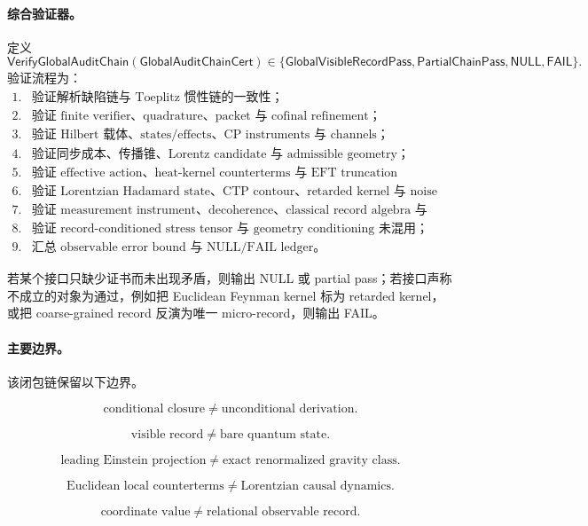 \paragraph{综合验证器。}
定义
\[
\mathsf{VerifyGlobalAuditChain}
(\mathsf{GlobalAuditChainCert})
\in
\{\mathsf{GlobalVisibleRecordPass},\mathsf{PartialChainPass},\mathsf{NULL},\mathsf{FAIL}\}.
\]
验证流程为：
\[
\begin{array}{ll}
1. & \text{验证解析缺陷链与 Toeplitz 惯性链的一致性；}\\
2. & \text{验证 finite verifier、quadrature、packet 与 cofinal refinement；}\\
3. & \text{验证 Hilbert 载体、states/effects、CP instruments 与 channels；}\\
4. & \text{验证同步成本、传播锥、Lorentz candidate 与 admissible geometry；}\\
5. & \text{验证 effective action、heat-kernel counterterms 与 EFT truncation residual；}\\
6. & \text{验证 Lorentzian Hadamard state、CTP contour、retarded kernel 与 noise bound；}\\
7. & \text{验证 measurement instrument、decoherence、classical record algebra 与 calibration；}\\
8. & \text{验证 record-conditioned stress tensor 与 geometry conditioning 未混用；}\\
9. & \text{汇总 observable error bound 与 NULL/FAIL ledger。}
\end{array}
\]

若某个接口只缺少证书而未出现矛盾，则输出 NULL 或 partial pass；若接口声称不成立的对象为通过，例如把 Euclidean Feynman kernel 标为 retarded kernel，或把 coarse-grained record 反演为唯一 micro-record，则输出 FAIL。

\paragraph{主要边界。}
该闭包链保留以下边界。

\[
\boxed{
\text{conditional closure}
\ne
\text{unconditional derivation}.
}
\]

\[
\boxed{
\text{visible record}
\ne
\text{bare quantum state}.
}
\]

\[
\boxed{
\text{leading Einstein projection}
\ne
\text{exact renormalized gravity class}.
}
\]

\[
\boxed{
\text{Euclidean local counterterms}
\ne
\text{Lorentzian causal dynamics}.
}
\]

\[
\boxed{
\text{coordinate value}
\ne
\text{relational observable record}.
}
\]

